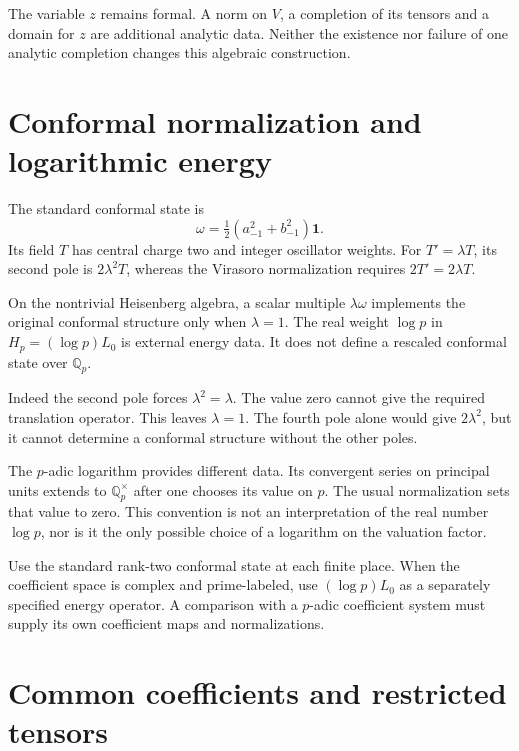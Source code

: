 The variable \(z\) remains formal. A norm on \(V\), a completion
of its tensors and a domain for \(z\) are additional analytic data.
Neither the existence nor failure of one analytic completion
changes this algebraic construction.

\section{Conformal normalization and logarithmic energy}
\label{v4-arith:dk:conformal-vector-scaling}

The standard conformal state is
\[
              \omega=\tfrac12(a_{-1}^2+b_{-1}^2)\mathbf1.
\]
Its field \(T\) has central charge two and integer oscillator
weights. For \(T'=\lambda T\), its second pole is
\(2\lambda^2T\), whereas the Virasoro normalization requires
\(2T'=2\lambda T\).

\begin{observation}\label{v4-arith:obs:log-p-not-padic}
On the nontrivial Heisenberg algebra, a scalar multiple
\(\lambda\omega\) implements the original conformal structure
only when \(\lambda=1\). The real weight \(\log p\) in
\(H_p=(\log p)L_0\) is external energy data.
It does not define a rescaled conformal state over \(\mathbb Q_p\).
\end{observation}

Indeed the second pole forces \(\lambda^2=\lambda\).
The value zero cannot give the required translation operator.
This leaves \(\lambda=1\). The fourth pole alone would give
\(2\lambda^2\), but it cannot determine a conformal structure
without the other poles.

The \(p\)-adic logarithm provides different data. Its convergent
series on principal units extends to \(\mathbb Q_p^\times\)
after one chooses its value on \(p\). The usual normalization
sets that value to zero. This convention is not an interpretation
of the real number \(\log p\), nor is it the only possible
choice of a logarithm on the valuation factor.

\begin{convention}\label{v4-arith:conv:log-p-archimedean}
Use the standard rank-two conformal state at each finite place.
When the coefficient space is complex and prime-labeled, use
\((\log p)L_0\) as a separately specified energy operator.
A comparison with a \(p\)-adic coefficient system must supply
its own coefficient maps and normalizations.
\end{convention}

\section{Common coefficients and restricted tensors}
\label{v4-arith:dk:restricted-tensor-not-field}

